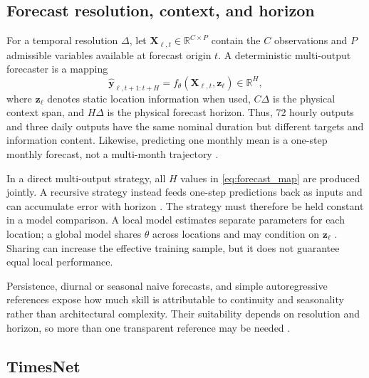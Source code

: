 \subsection{Forecast resolution, context, and horizon}

For a temporal resolution $\Delta$, let
$\mathbf{X}_{\ell,t}\in\mathbb{R}^{C\times P}$ contain the $C$ observations
and $P$ admissible variables available at forecast origin $t$. A deterministic
multi-output forecaster is a mapping
\begin{equation}
  \widehat{\mathbf{y}}_{\ell,t+1:t+H}
  =
  f_{\theta}\!\left(\mathbf{X}_{\ell,t},\mathbf{z}_{\ell}\right)
  \in\mathbb{R}^{H},
  \label{eq:forecast_map}
\end{equation}
where $\mathbf{z}_{\ell}$ denotes static location information when used,
$C\Delta$ is the physical context span, and $H\Delta$ is the physical forecast
horizon. Thus, 72 hourly outputs and three daily outputs have the same nominal
duration but different targets and information content. Likewise, predicting
one monthly mean is a one-step monthly forecast, not a multi-month trajectory
\cite{diagne2013,yang2018}.

In a direct multi-output strategy, all $H$ values in
\eqref{eq:forecast_map} are produced jointly. A recursive strategy instead
feeds one-step predictions back as inputs and can accumulate error with
horizon \cite{guariso2020}. The strategy must therefore be held constant in a
model comparison. A local model estimates separate parameters for each
location; a global model shares $\theta$ across locations and may condition on
$\mathbf{z}_{\ell}$ \cite{montero2021}. Sharing can increase the effective
training sample, but it does not guarantee equal local performance.

Persistence, diurnal or seasonal naive forecasts, and simple autoregressive
references expose how much skill is attributable to continuity and
seasonality rather than architectural complexity. Their suitability depends
on resolution and horizon, so more than one transparent reference may be
needed \cite{voyant2022}.

\subsection{TimesNet}

